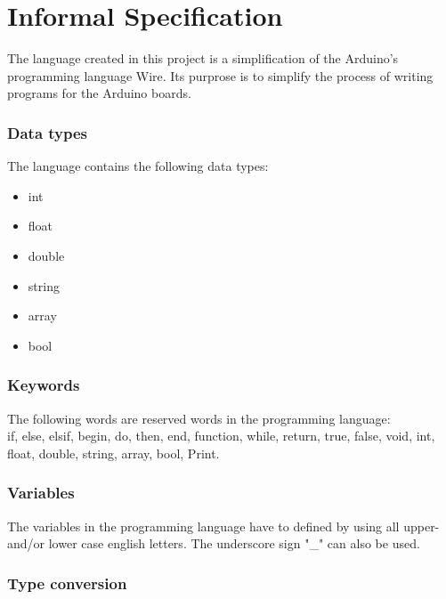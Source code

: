 \chapter{Informal Specification}\label{analysis:informal-specification}

The language created in this project is a simplification of the Arduino's programming language Wire. Its purprose is to simplify the process of writing programs for the Arduino boards.   

\subsection{Data types}
The language contains the following data types: 
\begin{itemize}
\item int
\item float
\item double
\item string
\item array
\item bool
\end{itemize}

\subsection{Keywords}
The following words are reserved words in the programming language:\\
if, else, elsif, begin, do, then, end, function, while, return, true, false, void, int, float, double, string, array, bool, Print.

\subsection{Variables}
The variables in the programming language have to defined by using all upper- and/or lower case english letters. The underscore sign "\_" can also be used. 

\subsection{Type conversion}
